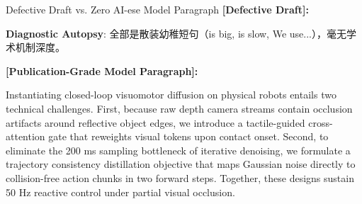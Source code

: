 \begin{ExampleBox}{Defective Draft vs. Zero AI-ese Model Paragraph}
\textbf{\color{TargetHighlight}[Defective Draft]:}\par
{}\par\vspace{4pt}
\textbf{Diagnostic Autopsy}: 全部是散装幼稚短句（is big, is slow, We use...），毫无学术机制深度。\par\vspace{6pt}
\textbf{\color{AcadNavy}[Publication-Grade Model Paragraph]:}\par
Instantiating closed-loop visuomotor diffusion on physical robots entails two technical challenges. First, because raw depth camera streams contain occlusion artifacts around reflective object edges, we introduce a tactile-guided cross-attention gate that reweights visual tokens upon contact onset. Second, to eliminate the 200 ms sampling bottleneck of iterative denoising, we formulate a trajectory consistency distillation objective that maps Gaussian noise directly to collision-free action chunks in two forward steps. Together, these designs sustain 50 Hz reactive control under partial visual occlusion.
\end{ExampleBox}
